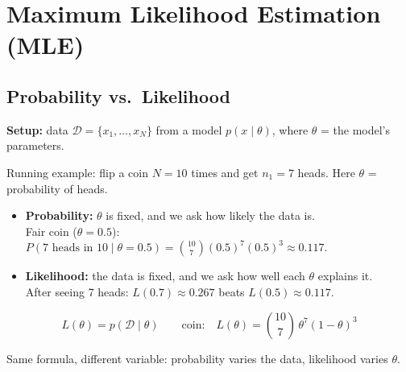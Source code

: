 \section*{Maximum Likelihood Estimation (MLE)}

\subsection*{Probability vs.\ Likelihood}
\textbf{Setup:} data $\mathcal{D} = \{x_1, \dots, x_N\}$ from a model $p(x \mid \theta)$, where $\theta$ = the model's parameters.

Running example: flip a coin $N = 10$ times and get $n_1 = 7$ heads. Here $\theta$ = probability of heads.

\begin{itemize}
  \item \textbf{Probability:} $\theta$ is fixed, and we ask how likely the data is.\\
  Fair coin ($\theta = 0.5$): $P(\text{7 heads in 10} \mid \theta = 0.5) = \binom{10}{7}(0.5)^7(0.5)^3 \approx 0.117$.
  \item \textbf{Likelihood:} the data is fixed, and we ask how well each $\theta$ explains it.\\
  After seeing 7 heads: $L(0.7) \approx 0.267$ beats $L(0.5) \approx 0.117$.
\end{itemize}
\[
L(\theta) = p(\mathcal{D} \mid \theta)
\qquad \text{coin:} \quad L(\theta) = \binom{10}{7}\,\theta^7 (1-\theta)^3
\]

Same formula, different variable: probability varies the data, likelihood varies $\theta$.

